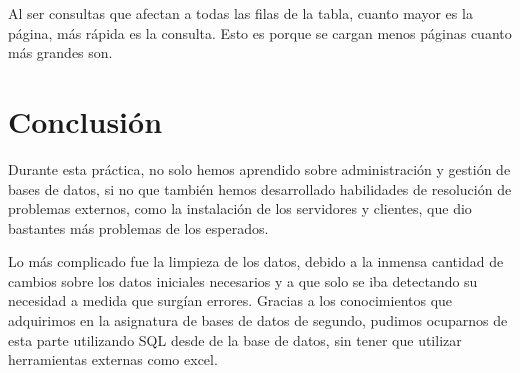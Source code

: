\documentclass[a4paper, 11pt, oneside]{article} %
\begin{document}
Al ser consultas que afectan a todas las filas de la tabla, cuanto mayor es la página, más rápida es la consulta. Esto es porque se cargan menos páginas cuanto más grandes son.

\newpage


\section{Conclusión}

Durante esta práctica, no solo hemos aprendido sobre administración y gestión de bases de datos, si no que también hemos desarrollado habilidades de resolución de problemas externos, como la instalación de los servidores y clientes, que dio bastantes más problemas de los esperados.

Lo más complicado fue la limpieza de los datos, debido a la inmensa cantidad de cambios sobre los datos iniciales necesarios y a que solo se iba detectando su necesidad a medida que surgían errores. Gracias a los conocimientos que adquirimos en la asignatura de bases de datos de segundo, pudimos ocuparnos de esta parte utilizando SQL desde de la base de datos, sin tener que utilizar herramientas externas como excel.

\fi
\end{document}

